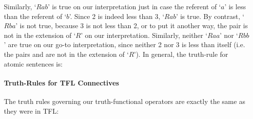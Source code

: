 Similarly, `$Rab$' is true on our interpretation just in case the referent of `$a$' is less than the referent of `$b$'.  Since 2 is indeed less than 3, `$Rab$' is true.  By contrast, `$Rba$' is not true, because 3 is not less than 2, or to put it another way, the pair  is not in the extension of `$R$' on our interpretation.  Similarly, neither `$Raa$' nor `$Rbb$' are true on our go-to interpretation, since neither 2 nor 3 is less than itself (i.e. the pairs  and  are not in the extension of `$R$').  In general, the truth-rule for atomic sentences is:


\paragraph{Truth-Rules for TFL Connectives} The truth rules governing our truth-functional operators are exactly the same as they were in TFL:

